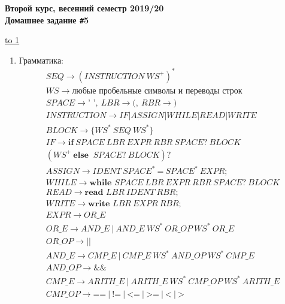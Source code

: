 \documentclass[14pt]{extarticle}
\def\t{\texttt}               %
\def\NO{\t{\#}}               %
\def\LINE{\vspace*{-1em}\noindent \underline{\hbox to 1\textwidth{{ } \hfil{ } \hfil{ } }}}
\begin{document}
\renewcommand{\dateseparator}{--}
\begin{center}
    {\Large\bf
        Второй курс, весенний семестр 2019/20\\
        Домашнее задание \NO5 \\
    }
\end{center}

\vspace{-1em}
\LINE
\vspace{1em}


\pagestyle{fancy}
\begin{enumerate}
    \item Грамматика:
          \begin{gather*}
              SEQ \to (INSTRUCTION\ WS^+)^*\\
              WS \to \textbf{любые пробельные символы и переводы строк}\\
              SPACE \to \textbf{' '},\ LBR \to \textbf{(},\ RBR \to \textbf{)}\\
              INSTRUCTION \to IF | ASSIGN | WHILE | READ | WRITE \\
              BLOCK \to \{ WS^*\ SEQ\ WS^*\}\\
              IF \to \textbf{if}\ SPACE\ LBR\ EXPR\ RBR \ SPACE?\ BLOCK \\
              (WS^+\ \textbf{else } \ SPACE?\ BLOCK)?\\
              ASSIGN \to IDENT\ SPACE^*\ \textbf{=}\ SPACE^*\ EXPR\text{;}\\
              WHILE \to \textbf{while } SPACE\ LBR\ EXPR\ RBR \ SPACE?\ BLOCK\\
              READ \to \textbf{read } LBR\ IDENT \ RBR \text{;}\\
              WRITE \to \textbf{write } LBR\ EXPR \ RBR \text{;}\\
              EXPR \to OR\_E\\
              OR\_E \to AND\_E\ |\ AND\_E\ WS^*\ OR\_OP\ WS^*\ OR\_E\\
              OR\_OP \to \textbf{||}\\
              AND\_E \to CMP\_E\ |\ CMP\_E\ WS^*\ AND\_OP\ WS^*\ CMP\_E\\
              AND\_OP \to \textbf{\&\&}\\
              CMP\_E \to ARITH\_E\ |\ ARITH\_E\ WS^*\ CMP\_OP\ WS^*\ ARITH\_E\\
              CMP\_OP \to \textbf{==}\ |\ \textbf{!=}\ |\ \textbf{<=}\ |\ \textbf{>=}\ |\
              \textbf{<}\ |\ \textbf{>}\\

\end{gather*}
\end{enumerate}
\end{document}
